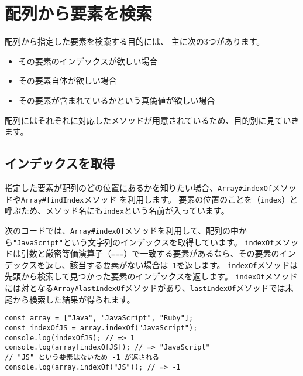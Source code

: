 \hypertarget{search-element}{%
\section{配列から要素を検索}\label{search-element}}

配列から指定した要素を検索する目的には、 主に次の3つがあります。

\begin{itemize}
\item
  その要素のインデックスが欲しい場合
\item
  その要素自体が欲しい場合
\item
  その要素が含まれているかという真偽値が欲しい場合
\end{itemize}

配列にはそれぞれに対応したメソッドが用意されているため、目的別に見ていきます。

\hypertarget{indexof}{%
\subsection{インデックスを取得}\label{indexof}}

指定した要素が配列のどの位置にあるかを知りたい場合、\texttt{Array\#indexOf}メソッドや\texttt{Array\#findIndex}メソッド\,\protect{}\,を利用します。
要素の位置のことを\textbf{}（\texttt{index}）と呼ぶため、メソッド名にも\texttt{index}という名前が入っています。

次のコードでは、\texttt{Array\#indexOf}メソッドを利用して、配列の中から\texttt{"JavaScript"}という文字列のインデックスを取得しています。
\texttt{indexOf}メソッドは引数と厳密等価演算子（\texttt{===}）で一致する要素があるなら、その要素のインデックスを返し、該当する要素がない場合は\texttt{-1}を返します。
\texttt{indexOf}メソッドは先頭から検索して見つかった要素のインデックスを返します。
\texttt{indexOf}メソッドには対となる\texttt{Array\#lastIndexOf}メソッドがあり、\texttt{lastIndexOf}メソッドでは末尾から検索した結果が得られます。

\begin{lstlisting}
const array = ["Java", "JavaScript", "Ruby"];
const indexOfJS = array.indexOf("JavaScript");
console.log(indexOfJS); // => 1
console.log(array[indexOfJS]); // => "JavaScript"
// "JS" という要素はないため -1 が返される
console.log(array.indexOf("JS")); // => -1
\end{lstlisting}

